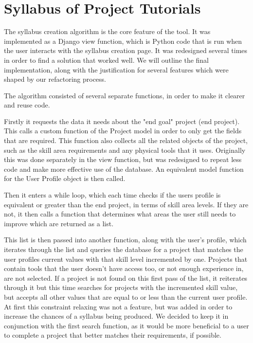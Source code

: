 \documentclass{l4proj}
\begin{document}
\section{Syllabus of Project Tutorials}
The syllabus creation algorithm is the core feature of the tool. It was implemented as a Django view function, which is Python code that is run when the user interacts with the syllabus creation page. It was redesigned several times in order to find a solution that worked well. We will outline the final implementation, along with the justification for several features which were shaped by our refactoring process. 

The algorithm consisted of several separate functions, in order to make it clearer and reuse code.

Firstly it requests the data it needs about the "end goal" project (end project). This calls a custom function of the Project model in order to only get the fields that are required. This function also collects all the related objects of the project, such as the skill area requirements and any physical tools that it uses. Originally this was done separately in the view function, but was redesigned to repeat less code and make more effective use of the database. An equivalent model function for the User Profile object is then called. 

Then it enters a while loop, which each time checks if the users profile is equivalent or greater than the end project, in terms of skill area levels. If they are not, it then calls a function that determines what areas the user still needs to improve which are returned as a list. 

This list is then passed into another function, along with the user's profile, which iterates through the list and queries the database for a project that matches the user profiles current values with that skill level incremented by one. Projects that contain tools that the user doesn't have access too, or not enough experience in, are not selected. If a project is not found on this first pass of the list, it reiterates through it but this time searches for projects with the incremented skill value, but accepts all other values that are equal to or less than the current user profile.  At first this constraint relaxing was not a feature, but was added in order to increase the chances of a syllabus being produced. We decided to keep it in conjunction with the first search function, as it would be more beneficial to a user to complete a project that better matches their requirements, if possible. 
\end{document}
